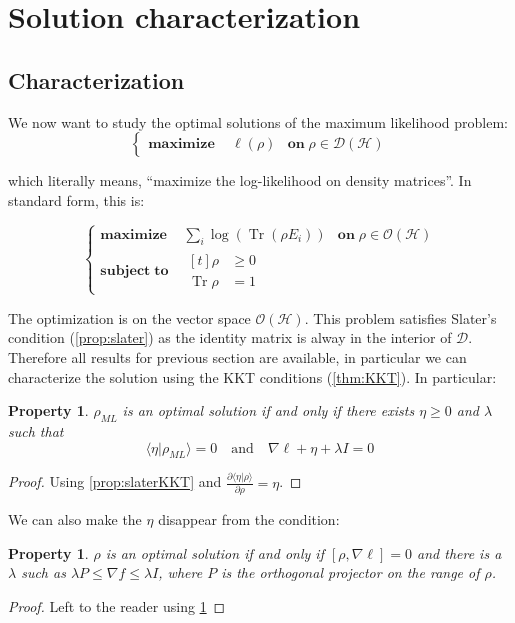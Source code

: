 \documentclass[10pt,a4paper]{report}
\theoremstyle{plain}
\newtheorem{prop}[thm]{Property}
\theoremstyle{definition}
\theoremstyle{remark}
\newcommand{\TODO}{\textbf{TODO}}
\newcommand{\braket}[2]{\langle#1|#2\rangle}
\newcommand{\dpar}[2]{\frac{\partial{#1}}{\partial{#2}}}
\renewcommand{\geq}{\geqslant}
\DeclareMathOperator{\Tr}{Tr}
\newcommand{\ml}{_{M\!L}}
\newcommand{\maximf}[2]{\begin{cases}
    \mathbf{maximize}\,\quad #1& \mathbf{on}\; #2
  \end{cases}}
\newcommand{\maxima}[3]{\begin{cases}
    \mathbf{maximize}\,\quad #1& \mathbf{on}\; #2\\
    \mathbf{subject\;to}\quad \begin{aligned}[t]#3\end{aligned}
  \end{cases}}
\begin{document}
\section{Solution characterization}

\subsection{Characterization}

We now want to study the optimal solutions of the maximum likelihood problem:
\[\maximf{\ell(\rho)}{\rho \in \mathcal{D}(\mathcal{H})} \]

which literally means, ``maximize the log-likelihood on density matrices''. In
standard form, this is:

\[\maxima{\displaystyle\sum_i \log(\Tr(\rho E_i))}{\rho \in \mathcal{O}(\mathcal{H})}
  {\rho &\geq 0\\\Tr \rho &= 1}
\]

The optimization is on the vector space $\mathcal{O}(\mathcal{H})$. This problem
satisfies Slater's condition (\ref{prop:slater}) as the identity matrix is alway
in the interior of $\mathcal{D}$. Therefore all results for previous section are
available, in particular we can characterize the solution using the KKT
conditions (\ref{thm:KKT}). In particular:

\begin{prop}\label{prop:caracKKT}
  $\rho\ml$ is an optimal solution if and only if there
exists $\eta \ge 0$ and $\lambda$ such that
\[\braket \eta {\rho\ml} = 0 \quad \text{and} \quad \nabla \ell + \eta +
  \lambda I = 0\]
\end{prop}

\begin{proof}
  Using \cref{prop:slaterKKT} and $\displaystyle\dpar{\braket \eta \rho}\rho = \eta$.
\end{proof}


We can also make the $\eta$ disappear from the condition:
\begin{prop}\label{prop:carac}
  $\rho$ is an optimal solution if and only if $[\rho, \nabla \ell] = 0$ and
  there is a $\lambda$ such as $\lambda P \le \nabla f \le \lambda I$, where $P$
  is the orthogonal projector on the range of $\rho$.
\end{prop}

\begin{proof}
  Left to the reader using \cref{prop:caracKKT}
\end{proof}
\end{document}
